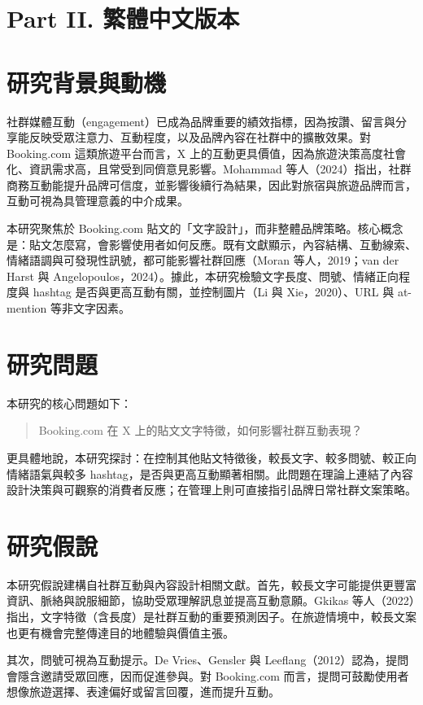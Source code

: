 \documentclass[12pt,a4paper]{ctexart}
\begin{document}
\newpage
\section*{Part II. 繁體中文版本}

\section{研究背景與動機}
社群媒體互動（engagement）已成為品牌重要的績效指標，因為按讚、留言與分享能反映受眾注意力、互動程度，以及品牌內容在社群中的擴散效果。對 Booking.com 這類旅遊平台而言，X 上的互動更具價值，因為旅遊決策高度社會化、資訊需求高，且常受到同儕意見影響。Mohammad 等人（2024）指出，社群商務互動能提升品牌可信度，並影響後續行為結果，因此對旅宿與旅遊品牌而言，互動可視為具管理意義的中介成果。

本研究聚焦於 Booking.com 貼文的「文字設計」，而非整體品牌策略。核心概念是：貼文怎麼寫，會影響使用者如何反應。既有文獻顯示，內容結構、互動線索、情緒語調與可發現性訊號，都可能影響社群回應（Moran 等人，2019；van der Harst 與 Angelopoulos，2024）。據此，本研究檢驗文字長度、問號、情緒正向程度與 hashtag 是否與更高互動有關，並控制圖片（Li 與 Xie，2020）、URL 與 at-mention 等非文字因素。

\section{研究問題}
本研究的核心問題如下：

\begin{quote}
Booking.com 在 X 上的貼文文字特徵，如何影響社群互動表現？
\end{quote}

更具體地說，本研究探討：在控制其他貼文特徵後，較長文字、較多問號、較正向情緒語氣與較多 hashtag，是否與更高互動顯著相關。此問題在理論上連結了內容設計決策與可觀察的消費者反應；在管理上則可直接指引品牌日常社群文案策略。

\section{研究假說}
本研究假說建構自社群互動與內容設計相關文獻。首先，較長文字可能提供更豐富資訊、脈絡與說服細節，協助受眾理解訊息並提高互動意願。Gkikas 等人（2022）指出，文字特徵（含長度）是社群互動的重要預測因子。在旅遊情境中，較長文案也更有機會完整傳達目的地體驗與價值主張。

其次，問號可視為互動提示。De Vries、Gensler 與 Leeflang（2012）認為，提問會隱含邀請受眾回應，因而促進參與。對 Booking.com 而言，提問可鼓勵使用者想像旅遊選擇、表達偏好或留言回覆，進而提升互動。
\end{document}

